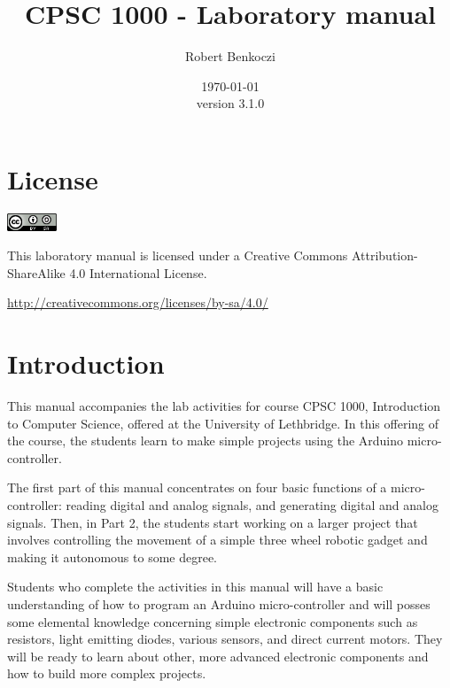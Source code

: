 \documentclass[12pt]{book}
\title{CPSC 1000 - Laboratory manual}    %
\author{Robert Benkoczi}              %
\date{\today\\ version 3.1.0}  %
\begin{document}
\frontmatter                            %
\maketitle                              %
\tableofcontents                        %

\chapter{License}


\includegraphics[width=4em]{by-sa.png}

\noindent
This laboratory manual is licensed under a Creative Commons
Attribution-ShareAlike 4.0 International License.

\noindent
\url{http://creativecommons.org/licenses/by-sa/4.0/}

\chapter{Introduction}

This manual accompanies the lab activities for course CPSC 1000,
Introduction to Computer Science, offered at the University of
Lethbridge. In this offering of the course, the students learn to
make simple projects using the Arduino micro-controller. 

The first part of this manual concentrates on four basic functions of
a micro-controller: reading digital and analog signals, and generating
digital and analog signals. Then, in Part 2, the students start
working on a larger project that involves controlling the movement of
a simple three wheel robotic gadget and making it autonomous to some
degree.

Students who complete the activities in this manual will have a basic
understanding of how to program an Arduino micro-controller and will
posses some elemental knowledge concerning simple electronic
components such as resistors, light emitting diodes, various sensors,
and direct current motors. They will be ready to learn about other, more
advanced electronic components and how to build more complex projects.
\end{document}
